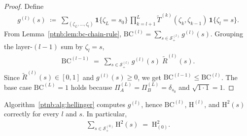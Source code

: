 \begin{proof}
Define
\begin{align}
    g^{(l)}(s) \;\coloneqq\; \sum_{(\zeta_L,\ldots,\zeta_l)} \mathbf{1}\{\zeta_L = s_0\}\,
    \prod_{k=l+1}^L \widetilde{T}^{(k)}(\zeta_k, \zeta_{k-1})\, \mathbf{1}\{\zeta_l = s\}.
\end{align}
From Lemma~\ref{ptnb:lem:bc-chain-rule}, $\mathrm{BC}^{(l)} = \sum_{s \in \mathcal{S}^{(l)}_+}
    g^{(l)}(s)$.  Grouping the layer-$(l-1)$ sum by $\zeta_l = s$,
\begin{align}
    \mathrm{BC}^{(l-1)} \;=\; \sum_{s \in \mathcal{S}^{(l)}_+} g^{(l)}(s)\; \widetilde{R}^{(l)}(s).
\end{align}
Since $\widetilde{R}^{(l)}(s) \in [0, 1]$ and $g^{(l)}(s) \geq 0$, we get $\mathrm{BC}^{(l-1)} \leq
    \mathrm{BC}^{(l)}$.  The base case $\mathrm{BC}^{(L)} = 1$ holds because $\Pi^{(L)}_A = \Pi^{(L)}_B
    = \delta_{s_0}$ and $\sqrt{1 \cdot 1} = 1$.
\end{proof}

\begin{lemmaenv}\label{ptnb:lem:hellinger-backward-correctness}
Algorithm~\ref{ptnb:alg:hellinger} computes $g^{(l)}$, hence $\mathrm{BC}^{(l)}$, $\mathrm{H}^{(l)}$,
and $\mathrm{H}^2(s)$ correctly for every $l$ and $s$.  In particular,
\begin{align}
    \sum_{s \in \mathcal{S}^{(0)}_+} \mathrm{H}^2(s) \;=\; \mathrm{H}^{2}_{(0)}.
\end{align}\end{lemmaenv}

